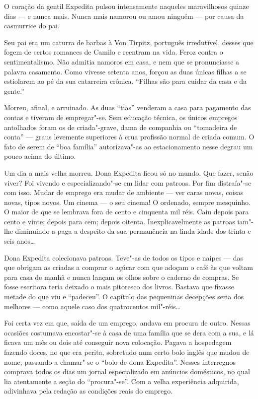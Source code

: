O coração da gentil Expedita pulsou intensamente naqueles maravilhosos
quinze dias --- e nunca mais. Nunca mais namorou ou amou ninguém --- por
causa da casmurrice do pai.

Seu pai era um caturra de barbas à Von Tirpitz, português irredutível,
desses que fogem de certos romances de Camilo e reentram na vida. Feroz
contra o sentimentalismo. Não admitia namoros em casa, e nem que se
pronunciasse a palavra casamento. Como vivesse setenta anos, forçou as
duas únicas filhas a se estiolarem ao pé da sua catarreira crônica.
``Filhas são para cuidar da casa e da gente.''

Morreu, afinal, e arruinado. As duas ``tias'' venderam a casa para
pagamento das contas e tiveram de empregar"-se. Sem educação técnica, os
únicos empregos antolhados foram os de criada"-grave, dama de companhia
ou ``tomadeira de conta'' --- graus levemente superiores à crua
profissão normal de criada comum. O fato de serem de ``boa família''
autorizava"-as ao estacionamento nesse degrau um pouco acima do último.

Um dia a mais velha morreu. Dona Expedita ficou só no mundo. Que fazer,
senão viver? Foi vivendo e especializando"-se em lidar com patroas. Por
fim distraía"-se com isso. Mudar de emprego era mudar de ambiente --- ver
caras novas, coisas novas, tipos novos. Um cinema --- o seu cinema! O
ordenado, sempre mesquinho. O maior de que se lembrava fora de cento e
cinquenta mil réis. Caiu depois para cento e vinte; depois para cem;
depois oitenta. Inexplicavelmente as patroas iam"-lhe diminuindo a paga a
despeito da sua permanência na linda idade dos trinta e seis anos\ldots{}

Dona Expedita colecionava patroas. Teve"-as de todos os tipos e naipes
--- das que obrigam as criadas a comprar o açúcar com que adoçam o café
às que voltam para casa de manhã e nunca lançam os olhos sobre o caderno
de compras. Se fosse escritora teria deixado o mais pitoresco dos
livros. Bastava que fixasse metade do que viu e ``padeceu''. O capítulo
das pequeninas decepções seria dos melhores --- como aquele caso dos
quatrocentos mil"-réis\ldots{}

Foi certa vez em que, saída de um emprego, andava em procura de outro.
Nessas ocasiões costumava encostar"-se à casa de uma família que se dera
com a sua, e lá ficava um mês ou dois até conseguir nova colocação.
Pagava a hospedagem fazendo doces, no que era perita, sobretudo num
certo bolo inglês que mudou de nome, passando a chamar"-se o ``bolo de
dona Expedita''. Nesses interregnos comprava todos os dias um jornal
especializado em anúncios domésticos, no qual lia atentamente a seção do
``procura"-se''. Com a velha experiência adquirida, adivinhava pela
redação as condições reais do emprego.

